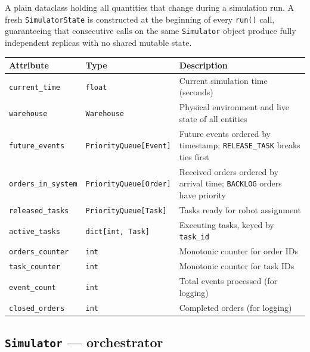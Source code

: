 \documentclass[a4paper,10pt]{article}
\begin{document}
A plain dataclass holding all quantities that change during a simulation run. A fresh \texttt{SimulatorState} is constructed at the beginning of every \texttt{run()} call, guaranteeing that consecutive calls on the same \texttt{Simulator} object produce fully independent replicas with no shared mutable state.

\vspace{0.4em}
\begin{tabularx}{\textwidth}{l l X}
\toprule
\textbf{Attribute} & \textbf{Type} & \textbf{Description} \\
\midrule
\texttt{current\_time}      & \texttt{float}                          & Current simulation time (seconds) \\
\texttt{warehouse}          & \texttt{Warehouse}                      & Physical environment and live state of all entities \\
\texttt{future\_events}     & \texttt{PriorityQueue[Event]}           & Future events ordered by timestamp; \texttt{RELEASE\_TASK} breaks ties first \\
\texttt{orders\_in\_system} & \texttt{PriorityQueue[Order]}           & Received orders ordered by arrival time; \texttt{BACKLOG} orders have priority \\
\texttt{released\_tasks}    & \texttt{PriorityQueue[Task]}            & Tasks ready for robot assignment \\
\texttt{active\_tasks}      & \texttt{dict[int, Task]}                & Executing tasks, keyed by \texttt{task\_id} \\
\texttt{orders\_counter}    & \texttt{int}                            & Monotonic counter for order IDs \\
\texttt{task\_counter}      & \texttt{int}                            & Monotonic counter for task IDs \\
\texttt{event\_count}       & \texttt{int}                            & Total events processed (for logging) \\
\texttt{closed\_orders}     & \texttt{int}                            & Completed orders (for logging) \\
\bottomrule
\end{tabularx}

\subsection{\texttt{Simulator} — orchestrator}
\end{document}
